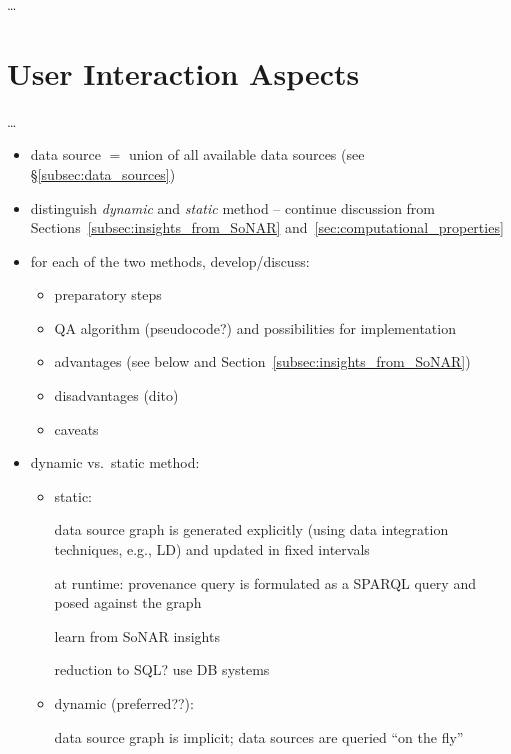 \dots

\section{User Interaction Aspects}
\label{sec:user_interaction}

\dots



\begin{itemize}
  \item
    data source $=$ union of all available data sources (see §\ref{subsec:data_sources})
  \item
    distinguish \emph{dynamic} and \emph{static} method -- continue discussion
    from Sections~\ref{subsec:insights_from_SoNAR} and~\ref{sec:computational_properties}
  \item
    for each of the two methods, develop/discuss:
    \begin{itemize}
      \item
        preparatory steps
      \item
        QA algorithm (pseudocode?) and possibilities for implementation
      \item
        advantages (see below and Section~\ref{subsec:insights_from_SoNAR})
      \item
        disadvantages (dito)
      \item
        caveats
    \end{itemize}
  \item
    dynamic vs.\ static method:
    \begin{itemize}
      \item
        static: 
        
        data source graph is generated explicitly (using data integration techniques, e.g., LD)
        and updated in fixed intervals
                
        at runtime: provenance query is formulated as a \gls{SPARQL} query and posed against the graph
        
        learn from SoNAR insights
        
        reduction to SQL? use DB systems
      \item
        dynamic (preferred??):
        
        data source graph is implicit; data sources are queried \enquote{on the fly}
        

\end{itemize}
\end{itemize}
